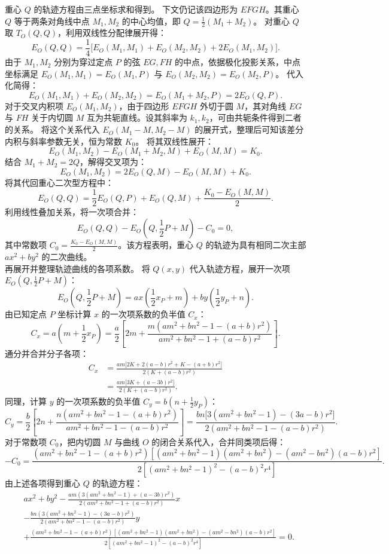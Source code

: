 \begin{solution}
重心 $Q$ 的轨迹方程由三点坐标求和得到。
下文仍记该四边形为 $EFGH$。其重心 $Q$ 等于两条对角线中点 $M_1, M_2$ 的中心均值，即 $Q = \frac{1}{2}(M_1 + M_2)$。
对重心 $Q$ 取 $T_O(Q,Q)$，利用双线性分配律展开得：
\[ E_O(Q, Q) = \frac{1}{4} \big[ E_O(M_1, M_1) + E_O(M_2, M_2) + 2E_O(M_1, M_2) \big]. \]
由于 $M_1, M_2$ 分别为穿过定点 $P$ 的弦 $EG, FH$ 的中点，依据极化投影关系，中点坐标满足 $E_O(M_1, M_1) = E_O(M_1, P)$ 与 $E_O(M_2, M_2) = E_O(M_2, P)$。
代入化简得：
\[ E_O(M_1, M_1) + E_O(M_2, M_2) = E_O(M_1 + M_2, P) = 2E_O(Q, P). \]
对于交叉内积项 $E_O(M_1, M_2)$，由于四边形 $EFGH$ 外切于圆 $M$，其对角线 $EG$ 与 $FH$ 关于内切圆 $M$ 互为共轭直线。设其斜率为 $k_1, k_2$，可由共轭条件得到二者的关系。
将这个关系代入 $E_O(M_1 - M, M_2 - M)$ 的展开式，整理后可知该差分内积与斜率参数无关，恒为常数 $K_0$。
将其双线性展开：
\[ E_O(M_1, M_2) - E_O(M_1 + M_2, M) + E_O(M, M) = K_0. \]
结合 $M_1 + M_2 = 2Q$，解得交叉项为：
\[ E_O(M_1, M_2) = 2E_O(Q, M) - E_O(M, M) + K_0. \]
将其代回重心二次型方程中：
\[ E_O(Q, Q) = \frac{1}{2} E_O(Q, P) + E_O(Q, M) + \frac{K_0 - E_O(M, M)}{2}. \]
利用线性叠加关系，将一次项合并：
\[ E_O(Q, Q) - E_O\left(Q, \frac{1}{2}P + M\right) - C_0 = 0, \]
其中常数项 $C_0 = \frac{K_0 - E_O(M, M)}{2}$。该方程表明，重心 $Q$ 的轨迹为具有相同二次主部 $ax^2 + by^2$ 的二次曲线。\\
再展开并整理轨迹曲线的各项系数。
将 $Q(x, y)$ 代入轨迹方程，展开一次项 $E_O\left(Q, \frac{1}{2}P + M\right)$：
\[ E_O\left(Q, \frac{1}{2}P + M\right) = a x \left( \frac{1}{2}x_P + m \right) + b y \left( \frac{1}{2}y_P + n \right). \]
由已知定点 $P$ 坐标计算 $x$ 的一次项系数的负半值 $C_x$：
\[ C_x = a \left( m + \frac{1}{2}x_P \right) = \frac{a}{2} \left[ 2m + \frac{m(am^2 + bn^2 - 1 - (a+b)r^2)}{am^2 + bn^2 - 1 + (a-b)r^2} \right]. \]
通分并合并分子各项：
\[
\begin{aligned}
C_x
&= \frac{am \big[ 2K + 2(a-b)r^2 + K - (a+b)r^2 \big]}{2\left(K + (a-b)r^2\right)} \\
&= \frac{am \big[ 3K + (a - 3b)r^2 \big]}{2\left(K + (a-b)r^2\right)}.
\end{aligned}
\]
同理，计算 $y$ 的一次项系数的负半值 $C_y = b \left( n + \frac{1}{2}y_P \right)$：
\[ C_y = \frac{b}{2} \left[ 2n + \frac{n(am^2 + bn^2 - 1 - (a+b)r^2)}{am^2 + bn^2 - 1 - (a-b)r^2} \right] = \frac{bn \big[ 3(am^2 + bn^2 - 1) - (3a - b)r^2 \big]}{2(am^2 + bn^2 - 1 - (a-b)r^2)}. \]
对于常数项 $C_0$，把内切圆 $M$ 与曲线 $O$ 的闭合关系代入，合并同类项后得：
\[ - C_0 = \frac{(am^2 + bn^2 - 1 - (a+b)r^2)\left[ (am^2 + bn^2 - 1)(am^2 + bn^2) - (am^2 - bn^2)(a-b)r^2 \right]}{2 \left[ (am^2 + bn^2 - 1)^2 - (a-b)^2 r^4 \right]}. \]
由上述各项得到重心 $Q$ 的轨迹方程：
\begin{align*}
&ax^2 + by^2 - \frac{am\left(3(am^2 + bn^2 - 1) + (a - 3b)r^2\right)}{2(am^2 + bn^2 - 1 + (a - b)r^2)}x \\
&- \frac{bn\left(3(am^2 + bn^2 - 1) - (3a - b)r^2\right)}{2(am^2 + bn^2 - 1 - (a - b)r^2)}y \\
&+ \frac{(am^2 + bn^2 - 1 - (a + b)r^2)\left[(am^2 + bn^2 - 1)(am^2 + bn^2) - (am^2 - bn^2)(a - b)r^2\right]}{2\left[(am^2 + bn^2 - 1)^2 - (a - b)^2 r^4\right]} = 0.
\end{align*}

\end{solution}




